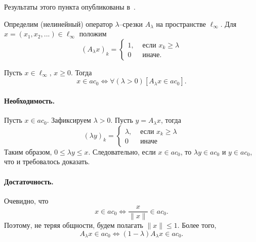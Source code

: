 Результаты этого пункта опубликованы в~\cite{our-mz2019ac0}.

Определим (нелинейный) оператор $\lambda$--срезки $A_\lambda$ на пространстве $\ell_\infty$.
Для $x = (x_1, x_2, ...) \in \ell_\infty$ положим
\begin{equation}
	(A_\lambda x)_k = \begin{cases}
		1, & \mbox{~если~} x_k \geq \lambda
		\\
		0  & \mbox{~иначе.~}
	\end{cases}
\end{equation}

\begin{theorem}
	Пусть $x\in\ell_\infty$, $x\geq 0$.
	Тогда
	\begin{equation}
		x\in ac_0 \Leftrightarrow
		\forall(\lambda>0)[A_\lambda x \in ac_0]
		.
	\end{equation}
\end{theorem}

\paragraph{Необходимость.}
Пусть $x\in ac_0$.
Зафиксируем $\lambda > 0$.
Пусть $y=A_\lambda x$, тогда
\begin{equation}
	(\lambda y)_k = \begin{cases}
		\lambda, & \mbox{~если~} x_k \geq \lambda
		\\
		0  & \mbox{~иначе~}
	\end{cases}
\end{equation}
Таким образом, $0 \leq \lambda y \leq x$.
Следовательно, если $x \in ac_0$,
то $\lambda y \in ac_0$ и $y \in ac_0$,
что и требовалось доказать.

\paragraph{Достаточность.}
Очевидно, что
\begin{equation}
	x\in ac_0 \Leftrightarrow
	\frac{x}{\|x\|}\in ac_0
	.
\end{equation}
Поэтому, не теряя общности, будем полагать $\|x\|\leq 1$.
Более того,
\begin{equation}
	A_\lambda x \in ac_0 \Leftrightarrow
	(1-\lambda)A_\lambda x \in ac_0
	.
\end{equation}

